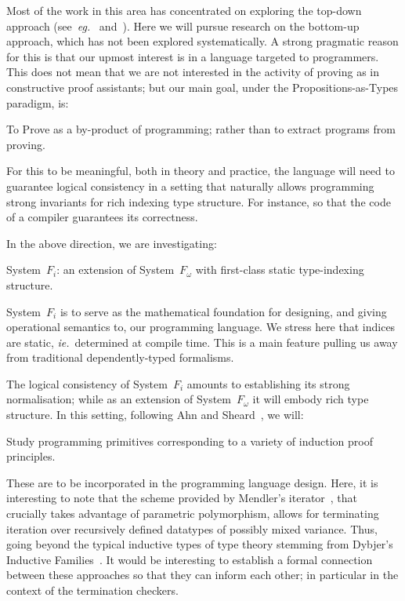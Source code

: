 \documentclass[11pt,twocolumn]{article}
\newcounter{CC}
\newenvironment{resenumerate}
  {\begin{list}{[\textbf{\arabic{CC}]}}
  {\usecounter{CC}
   \setlength{\topsep}{2pt}
   \setlength{\partopsep}{2pt}
   \setlength{\itemsep}{2.5pt}
   \setlength{\parsep}{2.5pt}
   \setlength{\leftmargin}{1.65em}
   \setlength{\labelwidth}{1.15em}
 }}
  {\end{list}}
\newcommand{\eg}{\emph{eg.}}
\newcommand{\ie}{\emph{ie.}}
\newcommand{\SystemFi}{\mbox{System~$F_i$}}
\newcommand{\SystemFomega}{\mbox{System~$F_\omega$}}
\begin{document}
Most of the work in this area has concentrated on exploring the top-down
approach (see~\eg~\cite{Cayenne} and~\cite{Epigram}).  Here we will pursue
research on the bottom-up approach, which has not been explored
systematically.  A strong pragmatic reason for this is that our upmost
interest is in a language targeted to programmers.  This does not mean that we
are not interested in the activity of proving as in constructive proof
assistants; but our main goal, under the Propositions-as-Types paradigm, is:
\begin{resenumerate}\setcounter{CC}{1}
\item
  To Prove as a by-product of programming; rather than to extract programs
  from proving.
\end{resenumerate}
For this to be meaningful, both in theory and practice, the language will
need to guarantee logical consistency in a setting that naturally allows
programming strong invariants for rich indexing type structure.  For
instance, so that the code of a compiler guarantees its correctness.

In the above direction, we are investigating:
\begin{resenumerate}\setcounter{CC}{2}
\item
  {\SystemFi}: an extension of {\SystemFomega} with first-class static
  type-indexing structure.
\end{resenumerate}
{\SystemFi} is to serve as the mathematical foundation for designing, and
giving operational semantics to, our programming language.  We stress here
that indices are static, \ie~determined at compile time.  This is a main
feature pulling us away from traditional dependently-typed formalisms.

The logical consistency of {\SystemFi} amounts to establishing its strong
normalisation; while as an extension of {\SystemFomega} it will embody
rich type structure.  In this setting, following Ahn and
Sheard~\cite{AhnSheard}, we will:
\begin{resenumerate}\setcounter{CC}{3}
\item
  Study programming primitives corresponding to a variety of induction
  proof principles.
\end{resenumerate}
These are to be incorporated in the programming language design.  Here, it
is interesting to note that the scheme provided by Mendler's
iterator~\cite{MendlerIter}, that crucially takes advantage of
parametric polymorphism, allows for terminating iteration over recursively
defined datatypes of possibly mixed variance.  Thus, going beyond the
typical inductive types of type theory stemming from Dybjer's Inductive
Families~\cite{DybjerIF}.  It would be interesting to establish a formal
connection between these approaches so that they can inform each other;
in particular in the context of the termination checkers. %
\end{document}

